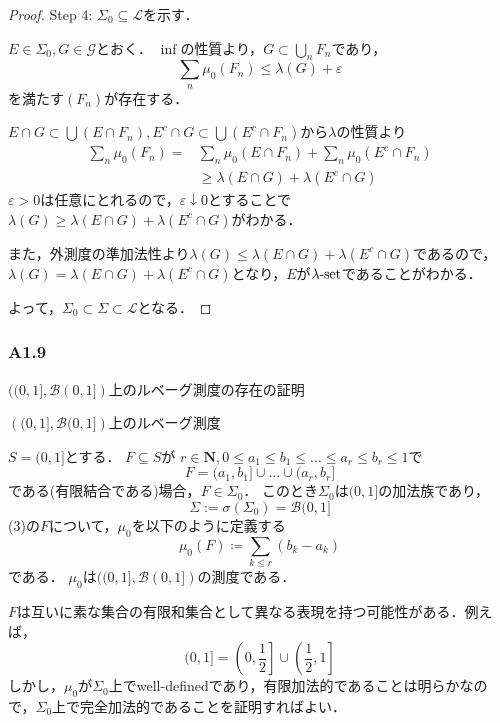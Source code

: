 \documentclass{jsarticle}
\begin{document}
\begin{proof}
Step 4: $\Sigma_0 \subseteq \mathcal{L}$を示す．

$E\in\Sigma_0,G\in\mathcal{G}$とおく．
$\inf$の性質より，$G\subset\bigcup_n F_n$であり，
\begin{equation}
    \sum_n\mu_0(F_n) \leq \lambda(G)+\varepsilon \nonumber
\end{equation}
を満たす$(F_n)$が存在する．

$E\cap G \subset \bigcup (E\cap F_n),E^c\cap G \subset \bigcup (E^c\cap F_n)$から$\lambda$の性質より
\begin{align}
    \sum_n\mu_0(F_n) = &\sum_n\mu_0(E\cap F_n)+\sum_n\mu_0(E^c\cap F_n) \nonumber \\
    &\geq \lambda(E\cap G) + \lambda(E^c\cap G) \nonumber
\end{align}
$\varepsilon>0$は任意にとれるので，$\varepsilon\downarrow 0$とすることで$\lambda(G) \geq \lambda(E\cap G) + \lambda(E^c\cap G)$がわかる．

また，外測度の準加法性より$\lambda(G) \leq \lambda(E\cap G) + \lambda(E^c\cap G)$であるので，
$\lambda(G) = \lambda(E\cap G) + \lambda(E^c\cap G)$となり，$E$が$\lambda{\rm \text{-}set}$であることがわかる．

よって，$\Sigma_0 \subset \Sigma \subset \mathcal{L}$となる．
\end{proof}


\subsubsection*{A1.9}
$((0,1],\mathcal{B}(0,1])$上のルベーグ測度の存在の証明
\begin{itembox}{}        
    $\left( (0,1] , \mathcal{B}(0,1] \right)$上のルベーグ測度
    
    $S=(0,1]$とする．
    $F\subseteq S$が
    $r\in\mathbf{N},0\leq a_1\leq b_1\leq\dots\leq a_r\leq b_r\leq 1$で
    \begin{equation}
        F=(a_1,b_1]\cup\dots\cup(a_r,b_r] \nonumber
    \end{equation}
    である(有限結合である)場合，$F\in\Sigma_0$．
    このとき$\Sigma_0$は$(0,1]$の加法族であり，
    \begin{equation}
        \Sigma:=\sigma(\Sigma_0)=\mathcal{B}(0,1] \nonumber
    \end{equation}
    (3)の$F$について，$\mu_0$を以下のように定義する
    \begin{equation}
        \mu_0(F)\coloneqq\sum_{k\leq r}(b_k-a_k) \nonumber
    \end{equation}
    である．
    $\mu_0$は$((0,1],\mathcal{B}(0,1])$の測度である．
\end{itembox}
$F$は互いに素な集合の有限和集合として異なる表現を持つ可能性がある．例えば，
\begin{equation}
    (0,1] = \left(0,\frac{1}{2}\right] \cup \left(\frac{1}{2},1\right] \nonumber
\end{equation}
しかし，$\mu_0$が$\Sigma_0$上でwell-definedであり，有限加法的であることは明らかなので，$\Sigma_0$上で完全加法的であることを証明すればよい．
\end{document}
